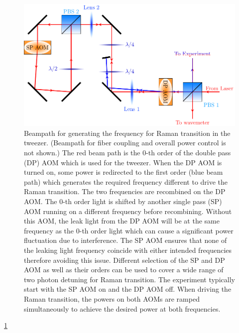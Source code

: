 \begin{figure}
  \centering
  \includegraphics[width=\textwidth]{figures/raman_spectroscopy_raman_beampath.pdf}
  \caption[Beampath to allow driving Raman transition with tweezer]{
    Beampath for generating the frequency for Raman transition in the tweezer.
    (Beampath for fiber coupling and overall power control is not shown.)
    The red beam path is the $0$-th order of the double pass (DP) AOM
    which is used for the tweezer.
    When the DP AOM is turned on, some power is redirected to the first order
    (blue beam path) which generates the required frequency different to drive
    the Raman transition. The two frequencies are recombined on the DP AOM.
    The $0$-th order light is shifted by another single pass (SP) AOM
    running on a different frequency before recombining.
    Without this AOM, the leak light from the DP AOM will be at the same frequency
    as the $0$-th order light which can cause a significant power fluctuation
    due to interference. The SP AOM ensures that none of the leaking light frequency
    coincide with either intended frequencies therefore avoiding this issue.
    Different selection of the SP and DP AOM as well as their orders can be used
    to cover a wide range of two photon detuning for Raman transition.
    The experiment typically start with the SP AOM on and the DP AOM off.
    When driving the Raman transition, the powers on both AOMs are ramped simultaneously
    to achieve the desired power at both frequencies.
    \label{fig:raman-spectroscopy:raman-beampath}}
\end{figure}

\ref{fig:raman-spectroscopy:raman-beampath}


